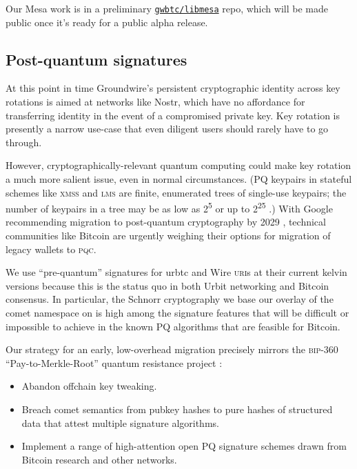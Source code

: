 \documentclass[twoside]{article}
\begin{document}
Our Mesa work is in a preliminary \href{https://github.com/gwbtc/libmesa}{\texttt{gwbtc/libmesa}} repo, which
will be made public once it's ready for a public alpha release.

\subsection{Post-quantum signatures}\label{post-quantum-signatures}

At this point in time Groundwire's persistent cryptographic identity
across key rotations is aimed at networks like Nostr, which have no
affordance for transferring identity in the event of a compromised
private key. Key rotation is presently a narrow use-case
that even diligent users should rarely have to go through.

However, cryptographically-relevant quantum computing could make key rotation a much
more salient issue, even in normal circumstances. (PQ keypairs in
stateful schemes like \textsc{xmss} and \textsc{lms} are finite, enumerated trees of
single-use keypairs; the number of keypairs in a tree may be as low as
2\textsuperscript{5} or up to 2\textsuperscript{25} \citep{NIST800208}.) With Google recommending
migration to post-quantum cryptography by 2029 \citep{GoogleQuantumAI2026}, technical
communities like Bitcoin are urgently weighing their options for
migration of legacy wallets to \textsc{pqc}.

We use ``pre-quantum'' signatures for urbtc and Wire \textsc{uri}s at their
current kelvin versions because this is the status quo in both Urbit
networking and Bitcoin consensus. In particular, the Schnorr
cryptography we base our overlay of the comet namespace on is high among
the signature features that will be difficult or impossible to achieve
in the known PQ algorithms that are feasible for Bitcoin.

Our strategy for an early, low-overhead migration precisely mirrors the
\textsc{bip}-360 ``Pay-to-Merkle-Root'' quantum resistance project \citep{BIP0360}:

\begin{itemize}[noitemsep,topsep=2pt]

\item
  Abandon offchain key tweaking.
\item
  Breach comet semantics from pubkey hashes to pure hashes of structured
  data that attest multiple signature algorithms.
\item
  Implement a range of high-attention open PQ signature schemes drawn
  from Bitcoin research and other networks.
\end{itemize}
\end{document}
